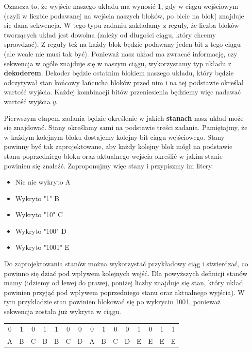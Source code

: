 Oznacza to, że wyjście naszego układu ma wynosić 1, gdy w ciągu wejściowym (czyli w liczbie podawanej na wejścia naszych bloków, po bicie na blok) znajduje się dana sekwencja. W tego typu zadaniu zakładamy z reguły, że liczba bloków tworzących układ jest dowolna (zależy od długości ciągu, który chcemy sprawdzać). Z reguły też na każdy blok będzie podawany jeden bit z tego ciągu (ale wcale nie musi tak być). Ponieważ nasz układ ma zwracać informację, czy sekwencja w ogóle znajduje się w naszym ciągu, wykorzystamy typ układu z \textbf{dekoderem}. Dekoder będzie ostatnim blokiem naszego układu, który będzie odczytywał stan końcowy łańcucha bloków przed nim i na tej podstawie określał wartość wyjścia. Każdej kombinacji bitów przeniesienia będziemy więc nadawać wartość wyjścia $y$.

Pierwszym etapem zadania będzie określenie w jakich \textbf{stanach} nasz układ może się znajdować. Stany określamy sami na podstawie treści zadania. Pamiętajmy, że w każdym kolejnym bloku dostajemy kolejny bit ciągu wejściowego. Stany powinny być tak zaprojektowane, aby każdy kolejny blok mógł na podstawie stanu poprzedniego bloku oraz aktualnego wejścia określić w jakim stanie powinien się znaleźć. Zaproponujmy więc stany i przypiszmy im litery:
\begin{itemize}
    \item Nic nie wykryto  A
    \item Wykryto "1"  B
    \item Wykryto "10"  C
    \item Wykryto "100"  D
    \item Wykryto "1001"  E
\end{itemize}
Do zaprojektowania stanów można wykorzystać przykładowy ciąg i stwierdzać, co powinno się dziać pod wpływem kolejnych wejść. Dla powyższych definicji stanów mamy (idziemy od lewej do prawej, poniżej liczby znajduje się stan, który układ powinien przyjąć pod wpływem poprzedniego stanu oraz aktualnego wyjścia). W tym przykładzie stan powinien blokować się po wykryciu 1001, ponieważ sekwencja została już wykryta w ciągu.

\begin{table}[h]
    \centering
    \begin{tabular}{|c|c|c|c|c|c|c|c|c|c|c|c|c|c|c|}
        0&1&0&1&1&0&0&0&1&0&0&1&0&1&1\\
        A&B&C&B&B&C&D&A&B&C&D&E&E&E&E\\
    \end{tabular}
\end{table}

